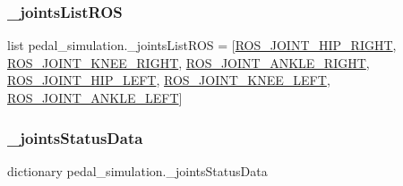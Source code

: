 \subsubsection{\texorpdfstring{\_jointsListROS}{\_jointsListROS}}
{\footnotesize\ttfamily list pedal\+\_\+simulation.\+\_\+joints\+List\+R\+OS = \mbox{[}\mbox{\hyperlink{namespacepedal__simulation_aa2d21a54aac1c1e059d8a17050ddfed4}{R\+O\+S\+\_\+\+J\+O\+I\+N\+T\+\_\+\+H\+I\+P\+\_\+\+R\+I\+G\+HT}}, \mbox{\hyperlink{namespacepedal__simulation_ad8c24ef49f1c476e1ad8be5bc4d1c710}{R\+O\+S\+\_\+\+J\+O\+I\+N\+T\+\_\+\+K\+N\+E\+E\+\_\+\+R\+I\+G\+HT}}, \mbox{\hyperlink{namespacepedal__simulation_a091f63fe58d9a41b150f5029e548f08f}{R\+O\+S\+\_\+\+J\+O\+I\+N\+T\+\_\+\+A\+N\+K\+L\+E\+\_\+\+R\+I\+G\+HT}}, \mbox{\hyperlink{namespacepedal__simulation_a6caf046a25da8884a3feed405121b7db}{R\+O\+S\+\_\+\+J\+O\+I\+N\+T\+\_\+\+H\+I\+P\+\_\+\+L\+E\+FT}}, \mbox{\hyperlink{namespacepedal__simulation_ada493a22ef9aa6120fb10a58db55e10d}{R\+O\+S\+\_\+\+J\+O\+I\+N\+T\+\_\+\+K\+N\+E\+E\+\_\+\+L\+E\+FT}}, \mbox{\hyperlink{namespacepedal__simulation_a402a36b90d4ebf203bc19976ec7d52c6}{R\+O\+S\+\_\+\+J\+O\+I\+N\+T\+\_\+\+A\+N\+K\+L\+E\+\_\+\+L\+E\+FT}}\mbox{]}\hspace{0.3cm}{\ttfamily [private]}}

\mbox{\label{namespacepedal__simulation_a60fc1e2941ecbd76f24d5190414a13b8}} 
\subsubsection{\texorpdfstring{\_jointsStatusData}{\_jointsStatusData}}
{\footnotesize\ttfamily dictionary pedal\+\_\+simulation.\+\_\+joints\+Status\+Data\hspace{0.3cm}{\ttfamily [private]}}

